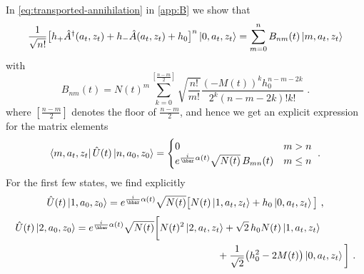 \documentclass[12pt]{iopart} %
\begin{document}
In \eqref{eq:transported-annihilation} in  \ref{app:B} we show that 
\begin{equation}\label{eq:binom-exp}
\frac{1}{\sqrt{n!}} \big[h_+ \hat A^{\dagger}(a_t,z_t)+h_-\hat A(a_t, z_t)+h_0\big]^n\ket{0,a_t,z_t}=
\sum_{m=0}^n  B_{nm}(t)\ket{m,a_t,z_t}
\end{equation}
with 
\begin{equation}\label{eq:matrix-elements-A} %
 B_{nm}(t)=N(t)^m\sum_{k=0}^{[\frac{n-m}{2}]}\sqrt{\frac{n!}{m!}} \frac{(-M(t))^{k} h_0^{n-m-2k}}{2^k(n-m-2k)!k!} \,\, .  
\end{equation}
where $[\frac{n-m}{2}]$ denotes the floor of $\frac{n-m}{2}$, and hence we get an explicit expression for the matrix elements
\begin{equation}\label{eq:matrix-elements-U}
\bra{m,a_t,z_t} \hat U(t) \ket{n,a_0,z_0}=\begin{cases} 0 & m>n\\
e^{\frac{i}{\hbar}\alpha(t)}\sqrt{N(t)}\, B_{mn}(t) & m\leq n \end{cases}\,\, .
\end{equation}
For the first few states, we find explicitly 
\begin{equation}
\hat U(t)\ket{1,a_0,z_0}=e^{\frac{i}{\hbar}\alpha(t)}\sqrt{N(t)}\big[N(t)\ket{1,a_t,z_t}+h_0\ket{0,a_t,z_t}\big]\,\, ,
\end{equation}
\begin{equation}
\begin{split}
\hat U(t)\ket{2,a_0,z_0}&=e^{\frac{i}{\hbar}\alpha(t)}\sqrt{N(t)}\bigg[N(t)^2\ket{2,a_t,z_t}+\sqrt{2}\, h_0N(t) \ket{1,a_t,z_t}\\
&\hspace*{5cm}+\frac{1}{\sqrt{2}}\big(h_0^2-2M(t)\big)\ket{0,a_t,z_t}\bigg]\,\, .
\end{split}
\end{equation}
\end{document}
